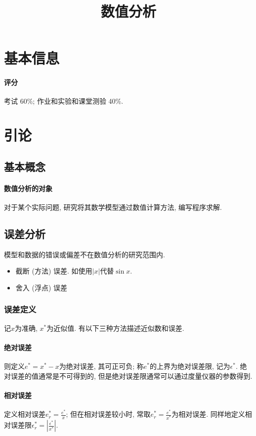 \documentclass{ctexart}
\title{数值分析}
\begin{document}
\maketitle

\tableofcontents

\section*{基本信息}
\paragraph{评分} 考试 60\%; 作业和实验和课堂测验 40\%.

\section{引论}
\subsection{基本概念}
\paragraph{数值分析的对象} 对于某个实际问题, 研究将其数学模型通过数值计算方法, 编写程序求解.

\subsection{误差分析}
    模型和数据的错误或偏差不在数值分析的研究范围内.
    \begin{itemize}
        \item 截断 (方法) 误差. 如使用$|x|$代替$\sin x$.
        \item 舍入 (浮点) 误差
    \end{itemize}
\subsubsection{误差定义}
    记$x$为准确, $x^*$为近似值. 有以下三种方法描述近似数和误差.
\paragraph{绝对误差}
    则定义$e^* = x^* - x$为绝对误差, 其可正可负;
        称$e^*$的上界为绝对误差限, 记为$\epsilon^*$.
    绝对误差的值通常是不可得到的, 但是绝对误差限通常可以通过度量仪器的参数得到.\par
\paragraph{相对误差}
    定义相对误差$e^*_r = \frac{e^*}{x}$;
    但在相对误差较小时, 常取$e^*_r = \frac{e^*}{x^*}$为相对误差.
    同样地定义相对误差限$\epsilon^*_r = |\frac{\epsilon^*}{x^*}|$.\par
\end{document}
